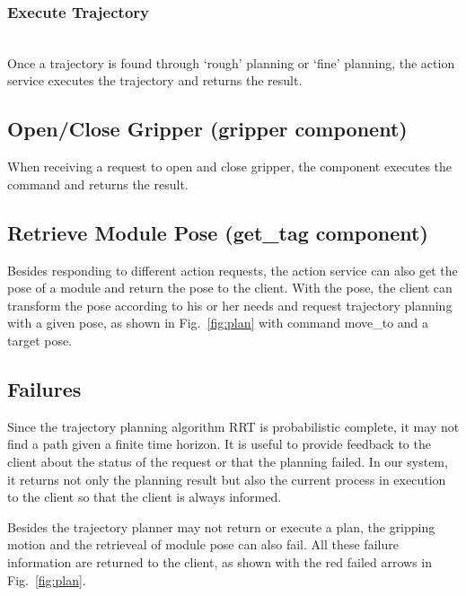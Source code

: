 \subsubsection{Execute Trajectory}~\\
Once a trajectory is found through `rough' planning or `fine' planning, the action service executes the trajectory and returns the result.


\subsection{Open/Close Gripper (gripper component)}
When receiving a request to open and close gripper, the component executes the command and returns the result.

\subsection{Retrieve Module Pose (get\_tag component)}
Besides responding to different action requests, the action service can also get the pose of a module and return the pose to the client. With the pose, the client can transform the pose according to his or her needs and request trajectory planning with a given pose, as shown in Fig.~\ref{fig:plan} with command move\_to and a target pose.


\subsection{Failures}
Since the trajectory planning algorithm RRT is probabilistic complete, it may not find a path given a finite time horizon. It is useful to provide feedback to the client about the status of the request or that the planning failed. In our system, it returns not only the planning result but also the current process in execution to the client so that the client is always informed.

Besides the trajectory planner may not return or execute a plan, the gripping motion and the retrieveal of module pose can also fail. All these failure information are returned to the client, as shown with the red failed arrows in Fig.~\ref{fig:plan}.


